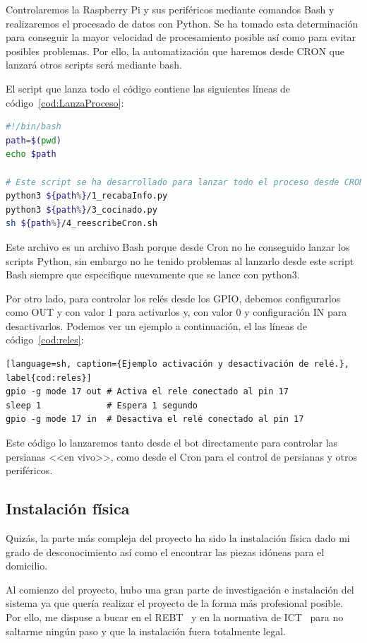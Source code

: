 Controlaremos la Raspberry Pi y sus periféricos mediante comandos Bash y realizaremos el procesado de datos con Python. Se ha tomado esta determinación para conseguir la mayor velocidad de procesamiento posible así como para evitar posibles problemas. Por ello, la automatización que haremos desde CRON que lanzará otros scripts será mediante bash. 

El script que lanza todo el código contiene las siguientes líneas de código~\ref{cod:LanzaProceso}:

\begin{lstlisting}[language=sh, caption={Script que lanza el proceso automático completo.}, label={cod:LanzaProceso}]
#!/bin/bash
path=$(pwd)
echo $path

# Este script se ha desarrollado para lanzar todo el proceso desde CRON.
python3 ${path%}/1_recabaInfo.py
python3 ${path%}/3_cocinado.py
sh ${path%}/4_reescribeCron.sh
\end{lstlisting}

Este archivo es un archivo Bash porque desde Cron no he conseguido lanzar los scripts Python, sin embargo no he tenido problemas al lanzarlo desde este script Bash siempre que especifique nuevamente que se lance con python3.

Por otro lado, para controlar los relés desde los GPIO, debemos configurarlos como OUT y con valor 1 para activarlos y, con valor 0 y configuración IN para desactivarlos. Podemos ver un ejemplo a continuación, el las líneas de código~\ref{cod:reles}:
\begin{lstlisting}[language=sh, caption={Ejemplo activación y desactivación de relé.}, label{cod:reles}]
gpio -g mode 17 out # Activa el rele conectado al pin 17
sleep 1             # Espera 1 segundo
gpio -g mode 17 in  # Desactiva el relé conectado al pin 17
\end{lstlisting}

Este código lo lanzaremos tanto desde el bot directamente para controlar las persianas <<en vivo>>, como desde el Cron para el control de persianas y otros periféricos.

\subsection{Instalación física}
Quizás, la parte más compleja del proyecto ha sido la instalación física dado mi grado de desconocimiento así como el encontrar las piezas idóneas para el domicilio.

Al comienzo del proyecto, hubo una gran parte de investigación e instalación del sistema ya que quería realizar el proyecto de la forma más profesional posible. Por ello, me dispuse a bucar en el REBT~\cite{manual:REBT} y en la normativa de ICT~\cite{manual:ICT-BT-21} para no saltarme ningún paso y que la instalación fuera totalmente legal.

